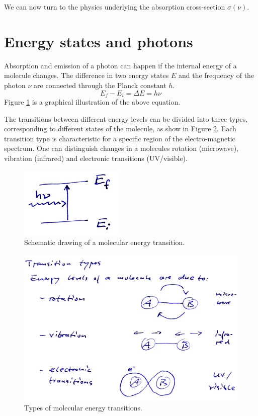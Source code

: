 We can now turn to the physics underlying the absorption cross-section
$\sigma(\nu)$. 

\section{Energy states and photons}
\label{sec:energy-states}
Absorption and emission of a photon can happen if the internal energy of a
molecule changes. The difference in two energy states $E$ and the frequency of
the photon $\nu$ are connected through the Planck constant $h$.
\begin{equation}
  E_f - E_i = \Delta E = h \nu
\end{equation}
Figure \ref{fig:schematic_energies} is a graphical illustration of the
above equation.

The transitions between different energy levels can be divided into
three types, corresponding to different states of the molecule, as
show in Figure \ref{fig:transition_types}.  Each transition type is
characteristic for a specific region of the electro-magnetic spectrum.
One can distinguish changes in a molecules rotation (microwave),
vibration (infrared) and electronic transitions (UV/visible).

\begin{figure}
  \centering
  \includegraphics[width=5cm]{figures/schematic_energy_states}
  \caption{Schematic drawing of a molecular energy transition.}
  \label{fig:schematic_energies}
\end{figure}

\begin{figure}
  \centering
  \includegraphics[width=\hsize]{figures/transition_types}
  \caption{Types of molecular energy transitions.}
  \label{fig:transition_types}
\end{figure}


